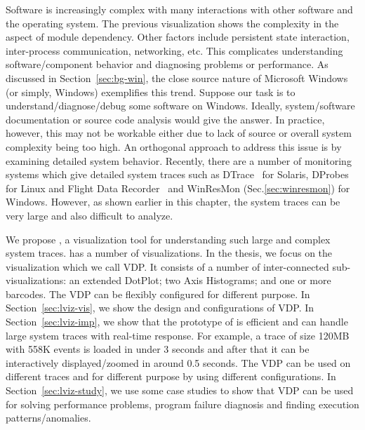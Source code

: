 
Software is increasingly complex with many interactions with other software
and the operating system.
The previous visualization shows the complexity in the
aspect of module dependency.
Other factors include persistent state interaction, inter-process communication,
networking, etc.
This complicates understanding software/component behavior and diagnosing
problems or performance.
As discussed in Section~\ref{sec:bg-win},
the close source nature of Microsoft Windows (or simply, Windows)
exemplifies this trend.
Suppose our task is to understand/diagnose/debug some software on Windows.
Ideally, system/software documentation or source code
analysis would give the answer.
In practice, however, this may not be
workable either due to lack of source or overall
system complexity being too high.
An orthogonal approach to address this issue is by examining
detailed system behavior.
Recently, there are a number of monitoring systems which
give detailed system traces such as DTrace~\cite{cantrill2004dynamic} for Solaris,
DProbes for Linux and Flight Data Recorder~\cite{verbowski6flight}
and WinResMon (Sec.\ref{sec:winresmon}) for Windows.
However, as shown earlier in this chapter,
the system traces can be very large and also
difficult to analyze.

We propose , a visualization tool for
understanding such large and complex system traces.
 has a number of visualizations.
In the thesis, we focus on the visualization which we call VDP.
It consists of a number of inter-connected sub-visualizations:
an extended DotPlot;
two Axis Histograms; and one or more barcodes.
The VDP can be flexibly configured for different purpose.
In Section~\ref{sec:lviz-vis}, we show the design and configurations of VDP.
In Section~\ref{sec:lviz-imp}, we show that
the prototype of  is efficient and can handle large system traces
with real-time response. For example, a trace of size 120MB with 558K events 
is loaded in under 3 seconds
and after that it can be interactively displayed/zoomed in around 0.5 seconds.
The VDP can be used on different traces and for different purpose
by using different configurations.
In Section~\ref{sec:lviz-study}, we use some case studies to show that
VDP can be used for solving performance problems,
program failure diagnosis and finding execution patterns/anomalies.
